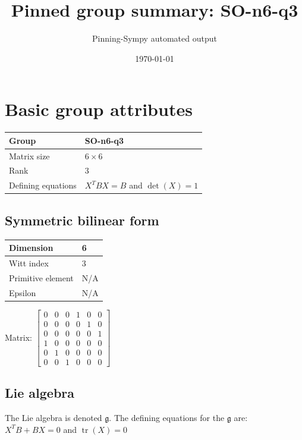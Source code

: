 \documentclass[11pt]{article}
\title{Pinned group summary: SO-n6-q3}
\author{Pinning-Sympy automated output}
\date{\today}
\newcommand{\frakg}{\mathfrak{g}}
\theoremstyle{definition}
\begin{document}
\maketitle
\tableofcontents

\newpage

\section{Basic group attributes}

\def\arraystretch{1.2}
\begin{tabular}{|l|l|}
	\hline
    Group & SO-n6-q3 \\
	\hline
    Matrix size & $6 \times 6$ \\
	\hline
    Rank & $3$ \\
	\hline
	Defining equations & $X^TBX = B$ and $\operatorname{det}(X)=1$ \\
	\hline
\end{tabular}
\def\arraystretch{1}

\subsection{Symmetric bilinear form}
\begin{tabular}{|l|l|}
    \hline
    Dimension & 6 \\
    \hline
    Witt index & 3 \\
    \hline
    Primitive element & N/A \\
    \hline
    Epsilon & N/A \\
    \hline
\end{tabular}

\bigskip
\noindent Matrix: \(
\left[\begin{matrix}0 & 0 & 0 & 1 & 0 & 0\\0 & 0 & 0 & 0 & 1 & 0\\0 & 0 & 0 & 0 & 0 & 1\\1 & 0 & 0 & 0 & 0 & 0\\0 & 1 & 0 & 0 & 0 & 0\\0 & 0 & 1 & 0 & 0 & 0\end{matrix}\right]
\)



\subsection{Lie algebra}

The Lie algebra is denoted $\frakg$. The defining equations for the $\frakg$ are: $X^TB + BX = 0$ and $\operatorname{tr}(X)=0$
\end{document}
